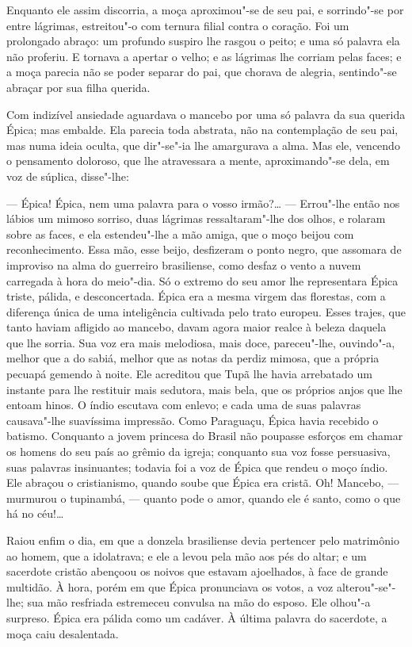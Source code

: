 Enquanto ele assim discorria, a moça aproximou"-se de seu pai, e
sorrindo"-se por entre lágrimas, estreitou"-o com ternura filial contra o
coração. Foi um prolongado abraço: um profundo suspiro lhe rasgou o
peito; e uma só palavra ela não proferiu. E tornava a apertar o velho; e
as lágrimas lhe corriam pelas faces; e a moça parecia não se poder
separar do pai, que chorava de alegria, sentindo"-se abraçar por sua
filha querida.

Com indizível ansiedade aguardava o mancebo por uma só palavra da sua
querida Épica; mas embalde. Ela parecia toda abstrata, não na
contemplação de seu pai, mas numa ideia oculta, que dir"-se"-ia lhe
amargurava a alma. Mas ele, vencendo o pensamento doloroso, que lhe
atravessara a mente, aproximando"-se dela, em voz de súplica, disse"-lhe:

--- Épica! Épica, nem uma palavra para o vosso irmão?\ldots{} --- Errou"-lhe
então nos lábios um mimoso sorriso, duas lágrimas ressaltaram"-lhe dos
olhos, e rolaram sobre as faces, e ela estendeu"-lhe a mão amiga, que o
moço beijou com reconhecimento. Essa mão, esse beijo, desfizeram o ponto
negro, que assomara de improviso na alma do guerreiro brasiliense, como
desfaz o vento a nuvem carregada à hora do meio"-dia. Só o extremo do seu
amor lhe representara Épica triste, pálida, e desconcertada. Épica era a
mesma virgem das florestas, com a diferença única de uma inteligência
cultivada pelo trato europeu. Esses trajes, que tanto haviam afligido ao
mancebo, davam agora maior realce à beleza daquela que lhe sorria. Sua
voz era mais melodiosa, mais doce, pareceu"-lhe, ouvindo"-a, melhor que a
do sabiá, melhor que as notas da perdiz mimosa, que a própria pecuapá
gemendo à noite. Ele acreditou que Tupã lhe havia arrebatado um instante
para lhe restituir mais sedutora, mais bela, que os próprios anjos que
lhe entoam hinos. O índio escutava com enlevo; e cada uma de suas
palavras causava"-lhe suavíssima impressão. Como Paraguaçu, Épica havia
recebido o batismo. Conquanto a jovem princesa do Brasil não poupasse
esforços em chamar os homens do seu país ao grêmio da igreja; conquanto
sua voz fosse persuasiva, suas palavras insinuantes; todavia foi a voz
de Épica que rendeu o moço índio. Ele abraçou o cristianismo, quando
soube que Épica era cristã. Oh! Mancebo, --- murmurou o tupinambá, ---
quanto pode o amor, quando ele é santo, como o que há no céu!\ldots{}

Raiou enfim o dia, em que a donzela brasiliense devia pertencer pelo
matrimônio ao homem, que a idolatrava; e ele a levou pela mão aos pés do
altar; e um sacerdote cristão abençoou os noivos que estavam ajoelhados,
à face de grande multidão. À hora, porém em que Épica pronunciava os
votos, a voz alterou"-se"-lhe; sua mão resfriada estremeceu convulsa na
mão do esposo. Ele olhou"-a surpreso. Épica era pálida como um cadáver. À
última palavra do sacerdote, a moça caiu desalentada.

